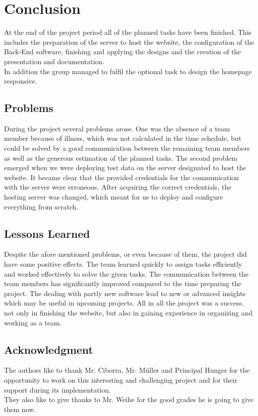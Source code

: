 \section{Conclusion} 
\label{sec:Conclusion}
At the end of the project period all of the planned tasks have been finished. 
This includes the preparation of the server to host the website, the configuration 
of the \acs{Back-End} software, finishing and applying the designs and the creation 
of the presentation and documentation.\\
In addition the group managed to fulfil the optional task to design the homepage \acs{responsive}.

\subsection{Problems}
During the project several problems arose. One was the absence of a team member 
because of illness, which was not calculated in the time schedule, but could be 
solved by a good communication between the remaining team members as well as the 
generous estimation of the planned tasks. The second problem emerged when we were
deploying test data on the server designated to host the website. It became clear 
that the provided credentials for the communication with the server were erroneous. 
After acquiring the correct credentials, the hosting server was changed, which meant 
for us to deploy and configure everything from scratch.

\subsection{Lessons Learned}
Despite the afore mentioned problems, or even because of them, the project did have 
some positive effects. The team learned quickly to assign tasks efficiently and worked 
effectively to solve the given tasks. The communication between the team members has 
significantly improved compared to the time preparing the project. The dealing with 
partly new software lead to new or advanced insights which may be useful in upcoming 
projects. All in all the project was a success, not only in finishing the website, 
but also in gaining experience in organizing and working as a team.


\subsection{Acknowledgment}
The authors like to thank Mr. Ciborra, Mr. M\"uller and Principal Hunger 
for the opportunity to work on this interesting and challenging project 
and for their support during its implementation.\\
They also like to give thanks to Mr. Weihe for the good grades he is going 
to give them now.

